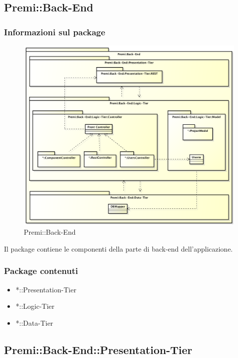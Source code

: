 \subsection{Premi::Back-End}
	\subsubsection{Informazioni sul package}
		\begin{figure}[h]
			\centering
			\includegraphics[width=\linewidth]{img/back-end-package}
			\caption[Premi::Back-End]{Premi::Back-End}
		\end{figure}
		Il package contiene le componenti della parte di back-end dell'applicazione.
		
	\subsubsection{Package contenuti}
		\begin{itemize}
			\item *::Presentation-Tier
			\item *::Logic-Tier
			\item *::Data-Tier
		\end{itemize}


\subsection{Premi::Back-End::Presentation-Tier}
